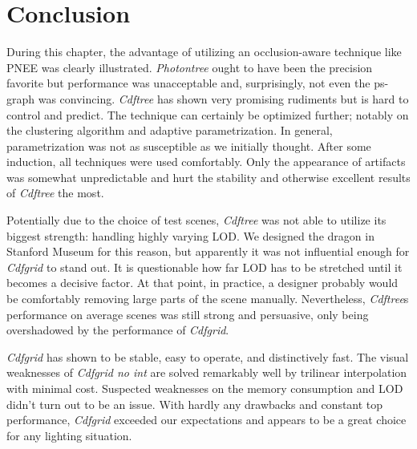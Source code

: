 \section{Conclusion}

During this chapter, the advantage of utilizing an occlusion-aware technique like PNEE was clearly illustrated. \textit{Photontree} ought to have been the precision favorite but performance was unacceptable and, surprisingly, not even the ps-graph was convincing. \textit{Cdftree} has shown very promising rudiments but is hard to control and predict. The technique can certainly be optimized further; notably on the clustering algorithm and adaptive parametrization. In general, parametrization was not as susceptible as we initially thought. After some induction, all techniques were used comfortably. Only the appearance of artifacts was somewhat unpredictable and hurt the stability and otherwise excellent results of \textit{Cdftree} the most. 

Potentially due to the choice of test scenes, \textit{Cdftree} was not able to utilize its biggest strength: handling highly varying LOD. We designed the dragon in Stanford Museum for this reason, but apparently it was not influential enough for \textit{Cdfgrid} to stand out. It is questionable how far LOD has to be stretched until it becomes a decisive factor. At that point, in practice, a designer probably would be comfortably removing large parts of the scene manually. Nevertheless, \textit{Cdftree}s performance on average scenes was still strong and persuasive, only being overshadowed by the performance of \textit{Cdfgrid}.

\textit{Cdfgrid} has shown to be stable, easy to operate, and distinctively fast. The visual weaknesses of \textit{Cdfgrid no int} are solved remarkably well by trilinear interpolation with minimal cost. Suspected weaknesses on the memory consumption and LOD didn't turn out to be an issue. With hardly any drawbacks and constant top performance, \textit{Cdfgrid} exceeded our expectations and appears to be a great choice for any lighting situation.
